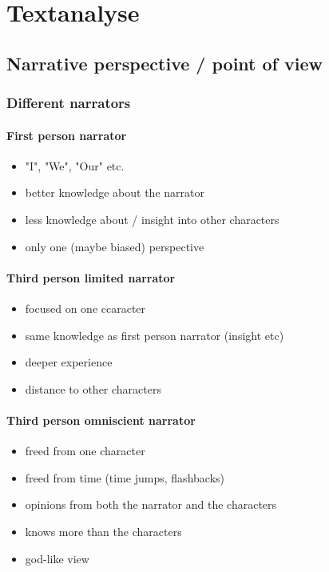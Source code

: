 \documentclass{article}
\begin{document}
	\section{Textanalyse}

	\subsection{Narrative perspective / point of view}

	\subsubsection{Different narrators}

	\paragraph{First person narrator}
	\begin{itemize}
		\item "I", "We", "Our" etc.
		\item better knowledge about the narrator
		\item less knowledge about / insight into other characters
		\item only one (maybe biased) perspective
	\end{itemize}

	\paragraph{Third person limited narrator}
	\begin{itemize}
		\item focused on one ccaracter
		\item same knowledge as first person narrator (insight etc)
		\item deeper experience
		\item distance to other characters
	\end{itemize}

	\paragraph{Third person omniscient narrator}
	\begin{itemize}
		\item freed from one character
		\item freed from time (time jumps, flashbacks)
		\item opinions from both the narrator and the characters
		\item knows more than the characters
		\item god-like view
	\end{itemize}
\end{document}
